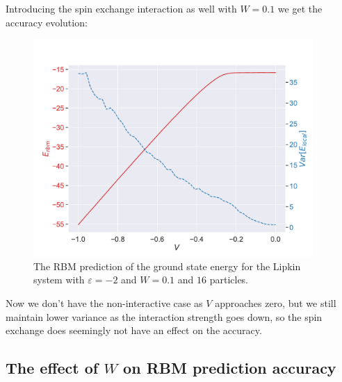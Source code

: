 Introducing the spin exchange interaction as well with $W=0.1$ we get the accuracy evolution:
\begin{figure}[H]
  \begin{center}
    \includegraphics[width=0.95\textwidth]{Figures/Plots/Lipkin/[V][-1.0-0.0][e=850][n=16][eps=-2][W=0.1].pdf}
  \end{center}
  \caption{The RBM prediction of the ground state energy for the Lipkin system with $\varepsilon=-2$ and $W=0.1$ and $16$ particles.}
\end{figure}

Now we don't have the non-interactive case as $V$ approaches zero, but we still maintain lower variance as the interaction strength goes down, so the spin exchange does seemingly not have an effect on the accuracy.

\subsection{The effect of \texorpdfstring{$W$}{W} on RBM prediction accuracy}

